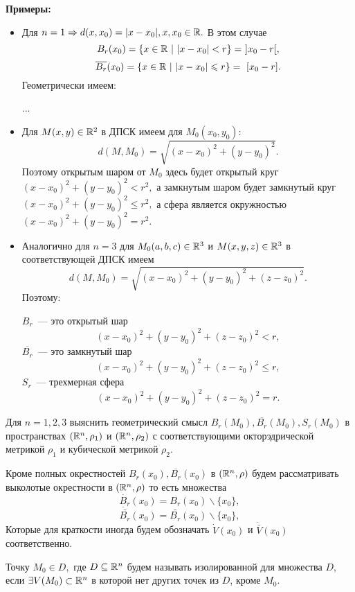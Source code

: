 \documentclass[../main.tex]{subfiles}
\begin{document}
	\smallskip
	\textbf{Примеры:}
	\begin{itemize}
	\item Для $n = 1 \Rightarrow d(x, x_0) = |x - x_0|, x, x_0 \in \mathbb{R}.$ В этом случае 
	$$
		B_r(x_0) = \{x \in \mathbb{R}\ |\ |x - x_0| < r\} =\ ] x_0 - r [,
	$$
	$$
		\overline{B_r}(x_0) = \{x \in \mathbb{R}\ |\ |x - x_0| \leqslant r\} =\ [ x_0 - r ].
	$$
	Геометрически имеем:
	
	...
	
	\item  Для $M(x, y) \in \mathbb{R}^2$ в ДПСК имеем для $M_0(x_0, y_0)$:
	$$
		d(M, M_0) = \sqrt{(x - x_0)^2 + (y - y_0)^2}.
	$$
	Поэтому открытым шаром от $M_0$ здесь будет открытый круг 
	$
		(x - x_0)^2 + (y - y_0)^2 < r^2,
	$ 
	а замкнутым шаром будет замкнутый круг 
	$
		(x - x_0)^2 + (y - y_0)^2 \leqslant r^2,
	$ 
	а сфера является окружностью 
	$
		(x - x_0)^2 + (y - y_0)^2 = r^2.
	$ 
	
	\item Аналогично для $n = 3$ для $M_0(a, b, c) \in \mathbb{R}^3$ и $M(x, y, z) \in \mathbb{R}^3$ в соответствующей ДПСК имеем  
	$$
		d(M, M_0) = \sqrt{(x - x_0)^2 + (y - y_0)^2 + (z - z_0)^2}.
	$$
	Поэтому:
	
	$B_r$~--- это открытый шар
	$$
		(x - x_0)^2 + (y - y_0)^2 + (z - z_0)^2 < r,
	$$
	$\overline{B_r}$~--- это замкнутый шар
	$$
	(x - x_0)^2 + (y - y_0)^2 + (z - z_0)^2 \leqslant r,
	$$	
	$S_r$~--- трехмерная сфера
	$$
	(x - x_0)^2 + (y - y_0)^2 + (z - z_0)^2 = r.
	$$
	\end{itemize}
	\begin{exc}
		Для $n = 1, 2, 3$  выяснить геометрический смысл $B_r(M_0), \overline{B_r}(M_0),  S_r(M_0)$ в пространствах $(\mathbb{R}^n, \rho_1)$ и $(\mathbb{R}^n, \rho_2)$  с соответствующими окторэдрической метрикой $\rho_1$ и кубической метрикой $\rho_2$. 
	\end{exc}
	\begin{rem}
		Кроме полных окрестностей $B_r(x_0), \overline{B_r}(x_0)$ в $(\mathbb{R}^n, \rho)$ будем рассматривать выколотые окрестности в $(\mathbb{R}^n, \rho)$ то есть множества
		$$
			\dot{B_r}(x_0) = B_r(x_0) \backslash \{x_0\},
		$$
		$$
			\dot{\bar{B_r}}(x_0) = \bar{B_r}(x_0) \backslash \{x_0\},
		$$
		Которые для краткости иногда будем обозначать $\dot{V}(x_0) $ и $\dot{\bar{V}}(x_0)$ соответственно. 
	\end{rem}
	\smallskip
	
	Точку $M_0 \in D,$ где $D \subseteq \mathbb{R}^n$ будем называть изолированной для множества $D$, если $\exists V(M_0) \subset \mathbb{R}^n$ в которой нет других точек из $D$, кроме $M_0$.
	
\end{document}
